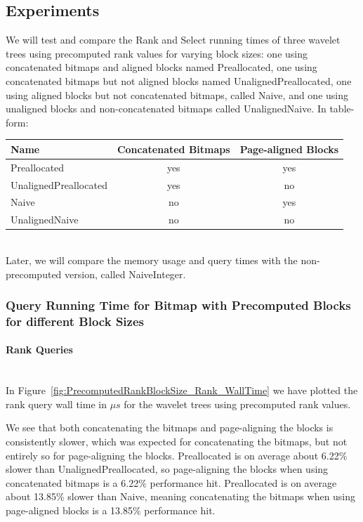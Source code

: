 \subsection{Experiments}
We will test and compare the Rank and Select running times of three wavelet trees using precomputed rank values for varying block sizes: one using concatenated bitmaps and aligned blocks named Preallocated, one using concatenated bitmaps but not aligned blocks named UnalignedPreallocated, one using aligned blocks but not concatenated bitmaps, called Naive,
and one using unaligned blocks and non-concatenated bitmaps called UnalignedNaive.
In table-form:\\
\begin{tabular}{|lcc|}
\hline
Name						& Concatenated Bitmaps	& Page-aligned Blocks	\\ \hline
Preallocated				& yes					& yes					\\ \hline
UnalignedPreallocated	& yes					& no						\\ \hline
Naive					& no						& yes					\\ \hline
UnalignedNaive			& no						& no						\\ \hline
\end{tabular}\\
Later, we will compare the memory usage and query times with the non-precomputed version, called NaiveInteger.

\subsubsection{Query Running Time for Bitmap with Precomputed Blocks for different Block Sizes}
\label{sec:queryRunTimePrecomputedBlockSizes}

\paragraph{Rank Queries}~\\
In Figure~\ref{fig:PrecomputedRankBlockSize_Rank_WallTime} we have plotted the rank query wall time in $\mu s$ for the wavelet trees using precomputed rank values.

We see that both concatenating the bitmaps and page-aligning the blocks is consistently slower, which was expected for concatenating the bitmaps, but not entirely so for page-aligning the blocks.
Preallocated is on average about 6.22\% slower than UnalignedPreallocated, so page-aligning the blocks when using concatenated bitmaps is a 6.22\% performance hit.
Preallocated is on average about 13.85\% slower than Naive, meaning concatenating the bitmaps when using page-aligned blocks is a 13.85\% performance hit.

